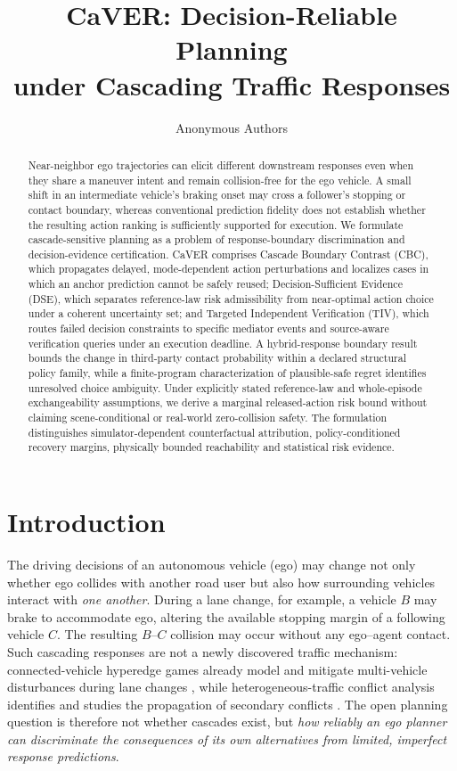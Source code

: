 \documentclass[10pt]{article}
\title{\textbf{CaVER: Decision-Reliable Planning\\under Cascading Traffic Responses}}
\author{Anonymous Authors}
\date{}
\begin{document}
\maketitle

\begin{abstract}
Near-neighbor ego trajectories can elicit different downstream responses even when they share a maneuver intent and remain collision-free for the ego vehicle. A small shift in an intermediate vehicle's braking onset may cross a follower's stopping or contact boundary, whereas conventional prediction fidelity does not establish whether the resulting action ranking is sufficiently supported for execution. We formulate cascade-sensitive planning as a problem of response-boundary discrimination and decision-evidence certification. CaVER comprises Cascade Boundary Contrast (CBC), which propagates delayed, mode-dependent action perturbations and localizes cases in which an anchor prediction cannot be safely reused; Decision-Sufficient Evidence (DSE), which separates reference-law risk admissibility from near-optimal action choice under a coherent uncertainty set; and Targeted Independent Verification (TIV), which routes failed decision constraints to specific mediator events and source-aware verification queries under an execution deadline. A hybrid-response boundary result bounds the change in third-party contact probability within a declared structural policy family, while a finite-program characterization of plausible-safe regret identifies unresolved choice ambiguity. Under explicitly stated reference-law and whole-episode exchangeability assumptions, we derive a marginal released-action risk bound without claiming scene-conditional or real-world zero-collision safety. The formulation distinguishes simulator-dependent counterfactual attribution, policy-conditioned recovery margins, physically bounded reachability and statistical risk evidence.
\end{abstract}

\section{Introduction}
\label{sec:introduction}
The driving decisions of an autonomous vehicle (ego) may change not only whether ego collides with another road user but also how surrounding vehicles interact with \emph{one another}. During a lane change, for example, a vehicle $B$ may brake to accommodate ego, altering the available stopping margin of a following vehicle $C$. The resulting $B$--$C$ collision may occur without any ego--agent contact. Such cascading responses are not a newly discovered traffic mechanism: connected-vehicle hyperedge games already model and mitigate multi-vehicle disturbances during lane changes \parencite{li2025mitigating}, while heterogeneous-traffic conflict analysis identifies and studies the propagation of secondary conflicts \parencite{luo2025analysis}. The open planning question is therefore not whether cascades exist, but \emph{how reliably an ego planner can discriminate the consequences of its own alternatives from limited, imperfect response predictions}.
\end{document}
